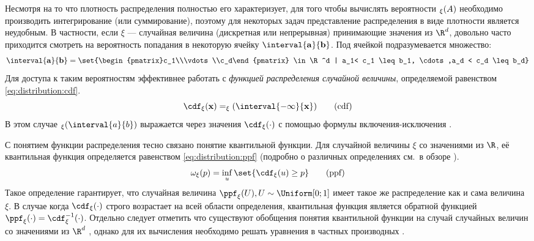 Несмотря на то что плотность распределения полностью его характеризует, для того чтобы вычислять вероятности $\P_\xi(A)$ необходимо производить интегрирование (или суммирование), поэтому для некоторых задач представление распределения в виде плотности является неудобным. В частности, если $\xi$ --- случайная величина (дискретная или непрерывная) принимающие значения из $\R^d$, довольно часто приходится смотреть на вероятность попадания в некоторую ячейку $\interval{\mathbf{a}}{\mathbf{b}}$. Под ячейкой подразумевается множество:
$$
    \interval{\mathbf{a}}{\mathbf{b}} = \set{\begin{pmatrix}c_1\\\vdots\\c_d\end{pmatrix} \in \R^d | a_1<  c_1 \leq b_1, \cdots,a_d < c_d \leq b_d} 
$$
Для доступа к таким вероятностям эффективнее работать с \emph{функцией распределения случайной величины}, определяемой равенством  \eqref{eq:distribution:cdf}. 
\begin{equation}
    \label{eq:distribution:cdf}
    \cdf_\xi(\mathbf{x}) = \P_\xi(\interval{\mathbf{-\infty}}{\mathbf{x}}) \tag{cdf}
\end{equation}
В этом случае $\P_\xi(\interval{a}{b})$ выражается через значения $\cdf_\xi(\cdot)$ с помощью формулы включения-исключения \cite{Feller2013}. 

С понятием функции распределения тесно связано понятие квантильной функции. Для случайной величины $\xi$ со значениями из $\R$, её квантильная функция определяется равенством \eqref{eq:distribution:ppf} (подробно о различных определениях см{.}~в обзоре  \cite{delafortelle2106}).
\begin{equation}
    \label{eq:distribution:ppf}
    \omega_{\xi}(p) = \inf_{u}\set{\cdf_\xi(u) \geq p} \tag{ppf}
\end{equation}
Такое определение гарантирует, что случайная величина $\ppf_{\xi}(U), U \sim \Uniform[0;1]$ имеет такое же распределение как и сама величина $\xi$. В случае когда $\cdf_\xi(\cdot)$ строго возрастает на всей области определения, квантильная функция является обратной функцией $\ppf_\xi(\cdot) = \cdf_\xi^{-1}(\cdot)$.  Отдельно следует отметить что существуют обобщения понятия квантильной функции на случай случайных величин со значениями из $\R^d$ \cite{hallin2024multivariate}, однако для их вычисления необходимо решать уравнения в частных производных \cite{figalli2018continuity}. 

